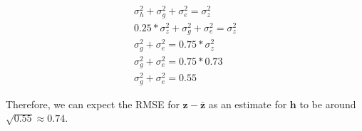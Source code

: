 \documentclass[11pt]{article} %
\providecommand{\DIFadd}[1]{{\protect\color{blue}\uwave{#1}}} %
\providecommand{\DIFdel}[1]{{\protect\color{red}\sout{#1}}}                      %
\providecommand{\DIFaddbegin}{} %
\providecommand{\DIFaddend}{} %
\providecommand{\DIFdelbegin}{} %
\providecommand{\DIFdelend}{} %
\providecommand{\DIFdelbeginFL}{} %
\newcommand{\DIFscaledelfig}{0.5}
\newlength{\DIFdelgraphicswidth} %
\newlength{\DIFdelgraphicsheight} %
\newcommand{\DIFaddincludegraphics}[2][]{{\color{blue}\fbox{\DIFOincludegraphics[#1]{#2}}}} %
\newcommand{\DIFdelincludegraphics}[2][]{%
\sbox{\DIFdelgraphicsbox}{\DIFOincludegraphics[#1]{#2}}%
\settoboxwidth{\DIFdelgraphicswidth}{\DIFdelgraphicsbox} %
\settoboxtotalheight{\DIFdelgraphicsheight}{\DIFdelgraphicsbox} %
\scalebox{\DIFscaledelfig}{%
\parbox[b]{\DIFdelgraphicswidth}{\usebox{\DIFdelgraphicsbox}\\[-\baselineskip] \rule{\DIFdelgraphicswidth}{0em}}\llap{\resizebox{\DIFdelgraphicswidth}{\DIFdelgraphicsheight}{%
\setlength{\unitlength}{\DIFdelgraphicswidth}%
\begin{picture}(1,1)%
\thicklines\linethickness{2pt} %
{\color[rgb]{1,0,0}\put(0,0){\framebox(1,1){}}}%
{\color[rgb]{1,0,0}\put(0,0){\line( 1,1){1}}}%
{\color[rgb]{1,0,0}\put(0,1){\line(1,-1){1}}}%
\end{picture}%
}\hspace*{3pt}}} %
} %
\DeclareRobustCommand{\DIFaddbegin}{\DIFOaddbegin \let\includegraphics\DIFaddincludegraphics} %
\DeclareRobustCommand{\DIFaddend}{\DIFOaddend \let\includegraphics\DIFOincludegraphics} %
\DeclareRobustCommand{\DIFdelbegin}{\DIFOdelbegin \let\includegraphics\DIFdelincludegraphics} %
\DeclareRobustCommand{\DIFdelend}{\DIFOaddend \let\includegraphics\DIFOincludegraphics} %
\DeclareRobustCommand{\DIFdelbeginFL}{\DIFOdelbeginFL \let\includegraphics\DIFdelincludegraphics} %
\begin{document}
\begin{doublespace}
\begin{equation}
\DIFdelbegin %
\DIFdelend \DIFaddbegin \begin{split}
    \sigma^2_{h} + \sigma^2_{g} + \sigma^2_e = \sigma^2_z \\
    0.25 * \sigma^2_{z} + \sigma^2_{g} + \sigma^2_e = \sigma^2_z \\
    \sigma^2_{g} + \sigma^2_e = 0.75 * \sigma^2_z \\
    \sigma^2_{g} + \sigma^2_e = 0.75 * 0.73 \\
    \sigma^2_{g} + \sigma^2_e = 0.55
\end{split}\DIFaddend 
\end{equation}

Therefore, we can expect the RMSE for \DIFdelbegin \DIFdel{$\bm{z} - \bm{\bar{z}}$ }\DIFdelend \DIFaddbegin \DIFadd{$z_i - \bar{z}$ }\DIFaddend as an estimate for \DIFdelbegin \DIFdel{$\bm{h}$ }\DIFdelend \DIFaddbegin \DIFadd{${h_i}$ }\DIFaddend to be around $\sqrt{0.55} \approx 0.74$. 

\newpage

\begin{figure}[H]
\DIFdelbeginFL %



\end{figure}
\end{doublespace}
\end{document}
